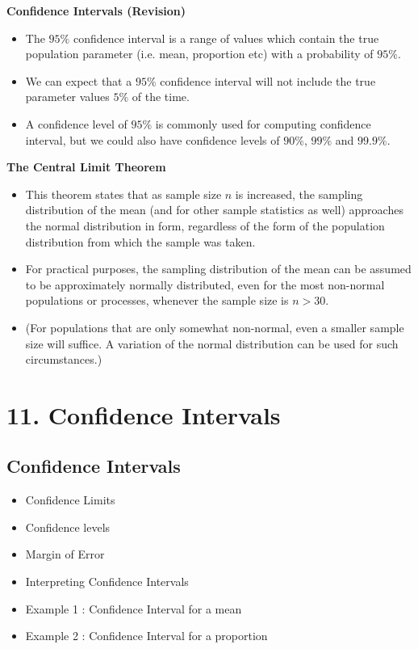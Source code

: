\documentclass[]{report}
\begin{document}



\textbf{Confidence Intervals (Revision) }

\begin{itemize}
\item The $95\%$ confidence interval is a range of values which contain the true population parameter (i.e. mean, proportion etc) with a probability of $95\%$.
\item We can expect that a $95\%$ confidence interval will not include the true parameter values $5\%$ of the time.
\item A confidence level of $95\%$ is commonly used for computing confidence interval, but we could also have confidence levels of $90\%$, $99\%$ and $99.9\%$.
\end{itemize}








\textbf{The Central Limit Theorem }
\begin{itemize}
\item This theorem states that as sample size $n$ is increased, the sampling distribution of the mean (and for other sample statistics as well) approaches the normal distribution in form, regardless of the form of the population distribution from
which the sample was taken.

\item For practical purposes, the sampling distribution of the mean can be assumed to be
approximately normally distributed, even for the most non-normal populations or processes, whenever the
sample size is $n > 30$.

\item (For populations that are only somewhat non-normal, even a smaller sample size will
suffice. A variation of the normal distribution can be used for such circumstances.)
\end{itemize}



\chapter{11. Confidence Intervals}
\section{Confidence Intervals}
\begin{itemize}
\item Confidence Limits
\item Confidence levels
\item Margin of Error
\item Interpreting Confidence Intervals
\item Example 1 : Confidence Interval for a mean
\item Example 2 : Confidence Interval for a proportion
\end{itemize}
\end{document}
